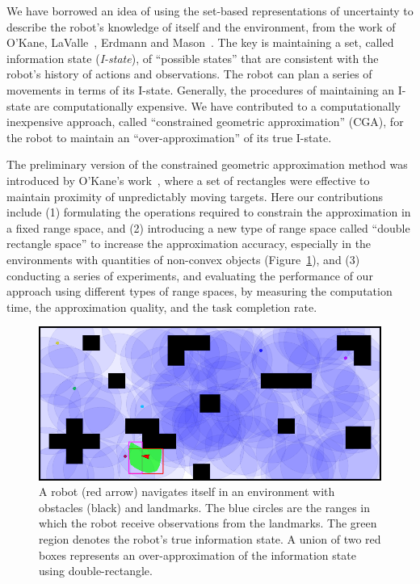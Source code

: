We have borrowed an idea of using the set-based representations of uncertainty to describe the robot's knowledge of
itself and the environment, from the work of O'Kane, LaValle~\cite{OKaLav08,Lav06}, Erdmann and Mason~\cite{ErdMas88}. The key is maintaining a set, called information state (\textit{I-state}), of ``possible states'' that are consistent with the robot's
history of actions and observations. The robot can plan a series of movements
in terms of its I-state. Generally, the procedures of maintaining an I-state are
computationally expensive. We have contributed to a computationally
inexpensive approach, called ``constrained geometric
approximation'' (CGA), for the robot to maintain an ``over-approximation'' of its true
I-state.

The preliminary version of the constrained geometric approximation method was
introduced by O'Kane's work~\cite{OKa11}, where a set of rectangles
were effective to maintain proximity of unpredictably moving targets. Here our 
contributions include (1) formulating the operations required to constrain the
approximation in a fixed range space, and (2) introducing a new type of range
space called ``double rectangle space'' to increase the approximation accuracy, especially in the environments with quantities of non-convex objects (Figure~\ref{fig:nav-clutter}), 
and (3) conducting a series of experiments, and evaluating the performance of
our approach using different types of range spaces, by measuring the computation time,
the approximation quality, and the task completion rate.

\begin{figure}
  \centering
  \includegraphics[width=.9\columnwidth]{figs/dbrect_clutter.png}
  \caption{A robot (red arrow) navigates itself in an environment with obstacles (black) and landmarks.
    The blue circles are the ranges in which the robot receive observations from the landmarks.
    The green region denotes the robot's true information state. 
    A union of two red boxes represents an over-approximation
    of the information state using double-rectangle.}
  \label{fig:nav-clutter}
\end{figure}

